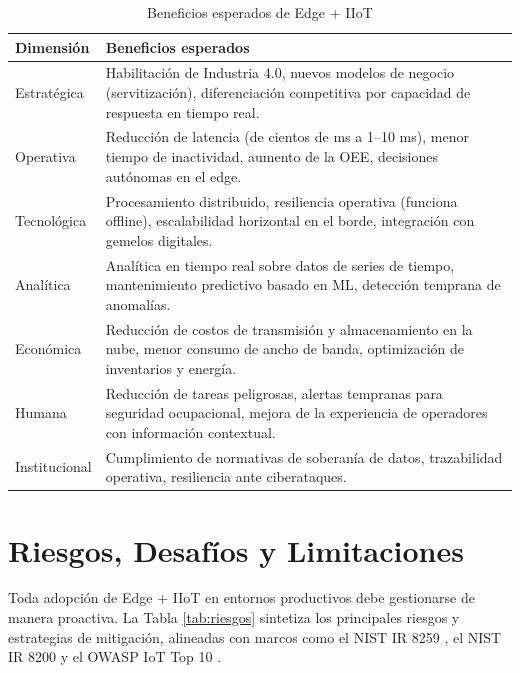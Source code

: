 ﻿\documentclass[12pt,a4paper,oneside]{article}
\begin{document}
\begin{table}[h!]
\centering
\caption{Beneficios esperados de Edge + IIoT}
\label{tab:beneficios}
\begin{tabular}{p{3.5cm} p{11cm}}
\toprule
\textbf{Dimensión} & \textbf{Beneficios esperados} \\
\midrule
Estratégica & Habilitación de Industria 4.0, nuevos modelos de negocio (servitización), diferenciación competitiva por capacidad de respuesta en tiempo real. \\
Operativa & Reducción de latencia (de cientos de ms a 1--10 ms), menor tiempo de inactividad, aumento de la OEE, decisiones autónomas en el edge. \\
Tecnológica & Procesamiento distribuido, resiliencia operativa (funciona offline), escalabilidad horizontal en el borde, integración con gemelos digitales. \\
Analítica & Analítica en tiempo real sobre datos de series de tiempo, mantenimiento predictivo basado en ML, detección temprana de anomalías. \\
Económica & Reducción de costos de transmisión y almacenamiento en la nube, menor consumo de ancho de banda, optimización de inventarios y energía. \\
Humana & Reducción de tareas peligrosas, alertas tempranas para seguridad ocupacional, mejora de la experiencia de operadores con información contextual. \\
Institucional & Cumplimiento de normativas de soberanía de datos, trazabilidad operativa, resiliencia ante ciberataques. \\
\bottomrule
\end{tabular}
\end{table}

\section{Riesgos, Desafíos y Limitaciones}

Toda adopción de Edge + IIoT en entornos productivos debe gestionarse de manera proactiva. La Tabla \ref{tab:riesgos} sintetiza los principales riesgos y estrategias de mitigación, alineadas con marcos como el NIST IR 8259 \cite{nistIR8259}, el NIST IR 8200 \cite{nistIR8200} y el OWASP IoT Top 10 \cite{owaspIoT2018}.
\end{document}
